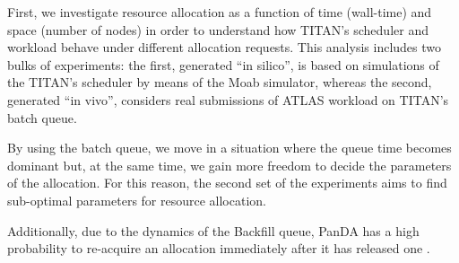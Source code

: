 First, we investigate resource allocation as a function of time (wall-time) and space (number of nodes) in order to understand how TITAN's scheduler and workload behave under different allocation requests. This analysis includes two bulks of experiments: the first, generated ``in silico'', is based on simulations of the TITAN's scheduler by means of the Moab simulator, whereas the second, generated ``in vivo'',  considers real submissions of ATLAS workload on TITAN's batch queue.

By using the batch queue, we move in a situation where the queue time becomes dominant but, at the same time, we gain more freedom to decide the parameters of the allocation. For this reason, the second set of the experiments aims to find sub-optimal parameters for resource allocation.

Additionally, due to the dynamics of the Backfill queue, PanDA has a high probability to re-acquire an allocation immediately after it has released one .
